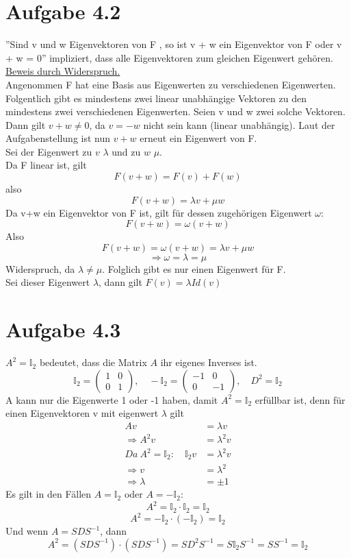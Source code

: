 \documentclass{article} %
\begin{document}
\section*{Aufgabe 4.2}
''Sind v und w Eigenvektoren von F , so ist v + w ein Eigenvektor von
F oder v + w = 0'' impliziert, dass alle Eigenvektoren zum gleichen Eigenwert gehören.  \\
\underline{Beweis durch Widerspruch.} \\
Angenommen F hat eine Basis aus Eigenwerten zu verschiedenen Eigenwerten. Folgentlich gibt es mindestens zwei linear unabhängige Vektoren zu den mindestens zwei verschiedenen Eigenwerten. Seien v und w zwei solche Vektoren. Dann gilt $v+w\neq 0$, da $v=-w$ nicht sein kann (linear unabhängig). Laut der Aufgabenstellung ist nun $v+w$ erneut ein Eigenwert von F. \\
Sei der Eigenwert zu $v$ $\lambda$ und zu $w$ $\mu$. \\
Da F linear ist, gilt 
\[F(v+w) = F(v) + F(w)\]
also
\[F(v+w) = \lambda v + \mu w\]
Da v+w ein Eigenvektor von F ist, gilt für dessen zugehörigen Eigenwert $\omega$:
\[
F(v+w) = \omega(v+w) 
\]
Also
\[
F(v+w) = \omega(v+w) = \lambda v + \mu w
\]
\[
\Rightarrow \omega = \lambda = \mu 
\]
Widerspruch, da $\lambda \neq \mu$. Folglich gibt es nur einen Eigenwert für F. \\ 
Sei dieser Eigenwert $\lambda$, dann gilt $F(v) = \lambda Id(v)$



\section*{Aufgabe 4.3}

$A^2 = \mathbb{I}_2$ bedeutet, dass die Matrix $A$ ihr eigenes Inverses ist. 
\[
\mathbb{I}_2 = \begin{pmatrix}
  1&0\\0&1
\end{pmatrix}, \quad -\mathbb{I}_2 = \begin{pmatrix}
  -1&0\\0&-1
\end{pmatrix}, \quad D^2 = \mathbb{I}_2
\]
A kann nur die Eigenwerte 1 oder -1 haben, damit $A^2 = \mathbb{I}_2$ erfüllbar ist, denn für einen Eigenvektoren v mit eigenwert $\lambda$ gilt 
\begin{align*}
    Av & = \lambda v \\
    \Rightarrow A^2 v & = \lambda^2 v \\
    Da\ A^2 = \mathbb{I}_2: \quad \mathbb{I}_2 v & = \lambda^2 v \\
    \Rightarrow v & = \lambda^2 \\
    \Rightarrow \lambda & = \pm 1
\end{align*}
Es gilt in den Fällen $A = \mathbb{I}_2$ oder $A = -\mathbb{I}_2$: 
\[
A^2 = \mathbb{I}_2 \cdot \mathbb{I}_2 = \mathbb{I}_2 
\]
\[
A^2 = -\mathbb{I}_2 \cdot (-\mathbb{I}_2) = \mathbb{I}_2 
\]
Und wenn $A = SDS^{-1}$, dann 
\[
A^2 = (SDS^{-1}) \cdot (SDS^{-1}) = SD^2S^{-1}  = S\mathbb{I}_2S^{-1} = SS^{-1} = \mathbb{I}_2
\]
\end{document}
